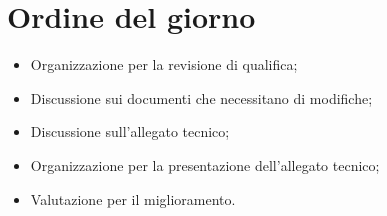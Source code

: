 \section{Ordine del giorno}
\begin{itemize}
\item Organizzazione per la revisione di qualifica;
\item Discussione sui documenti che necessitano di modifiche;
\item Discussione sull'allegato tecnico;
\item Organizzazione per la presentazione dell'allegato tecnico;
\item Valutazione per il miglioramento.
\end{itemize}